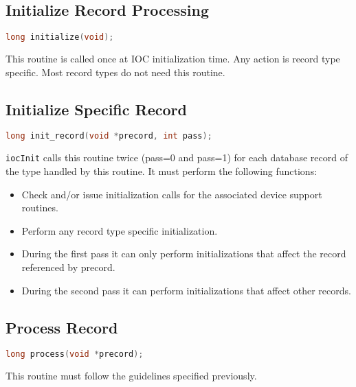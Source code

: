 \subsection{Initialize Record Processing}

\begin{lstlisting}[language=C]
long initialize(void);
\end{lstlisting}

This routine is called once at IOC initialization time.
Any action is record type specific.
Most record types do not need this routine.

\subsection{Initialize Specific Record}

\begin{lstlisting}[language=C]
long init_record(void *precord, int pass);
\end{lstlisting}

\verb|iocInit| calls this routine twice (pass=0 and pass=1) for each database record of the type handled by this routine.
It must perform the following functions:

\begin{itemize}
\item Check and/or issue initialization calls for the associated device support routines.

\item Perform any record type specific initialization.

\item During the first pass it can only perform initializations that affect the record referenced by precord.

\item During the second pass it can perform initializations that affect other records.

\end{itemize}

\subsection{Process Record}

\begin{lstlisting}[language=C]
long process(void *precord);
\end{lstlisting}

This routine must follow the guidelines specified previously.

